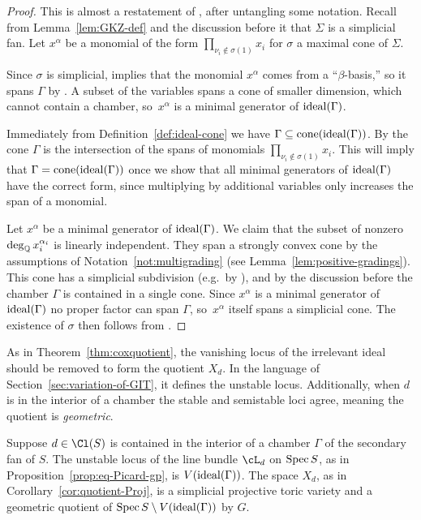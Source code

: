 \documentclass{article}
\begin{document}
\begin{proof}
  This is almost a restatement of \cite[Proposition 15.2.1]{CLS2011}, after untangling some notation.  Recall from Lemma~\ref{lem:GKZ-def} and the discussion before it that $\Sigma$ is a simplicial fan.  Let $x^\alpha$ be a monomial of the form $\prod_{\nu_i\notin\sigma(1)}x_i$ for $\sigma$ a maximal cone of $\Sigma$.

  Since $\sigma$ is simplicial, \cite[Proposition 14.3.1]{CLS2011} implies that the monomial $x^\alpha$ comes from a ``$\beta$-basis,'' so it spans $\Gamma$ by \cite[Proposition 15.2.1(b)]{CLS2011}.  A subset of the variables spans a cone of smaller dimension, which cannot contain a chamber, so~$x^\alpha$ is a minimal generator of $\operatorname{ideal}(\Gamma)$.

  Immediately from Definition~\ref{def:ideal-cone} we have $\Gamma\subseteq\operatorname{cone}(\operatorname{ideal}(\Gamma))$.  By \cite[Proposition 15.2.1(c)]{CLS2011} the cone $\Gamma$ is the intersection of the spans of monomials $\prod_{\nu_i\notin\sigma(1)}x_i$.  This will imply that $\Gamma=\operatorname{cone}(\operatorname{ideal}(\Gamma))$ once we show that all minimal generators of $\operatorname{ideal}(\Gamma)$ have the correct form, since multiplying by additional variables only increases the span of a monomial.

  Let $x^\alpha$ be a minimal generator of $\operatorname{ideal}(\Gamma)$.  We claim that the subset of nonzero $\deg_\mathbb Q x_i^{\alpha_i}$ is linearly independent.  They span a strongly convex cone by the assumptions of Notation~\ref{not:multigrading} (see Lemma~\ref{lem:positive-gradings}).  This cone has a simplicial subdivision (e.g.~by \cite[Corollary~3.8]{OP91}), and by the discussion before \cite[Proposition 15.2.10]{CLS2011} the chamber $\Gamma$ is contained in a single cone.  Since $x^\alpha$ is a minimal generator of $\operatorname{ideal}(\Gamma)$ no proper factor can span $\Gamma$, so~$x^\alpha$ itself spans a simplicial cone.  The existence of $\sigma$ then follows from \cite[Proposition 15.2.1(b)]{CLS2011}.  %
\end{proof}

As in Theorem~\ref{thm:coxquotient}, the vanishing locus of the irrelevant ideal should be removed to form the quotient $X_d$.  In the language of Section~\ref{sec:variation-of-GIT}, it defines the unstable locus.  Additionally, when $d$ is in the interior of a chamber the stable and semistable loci agree, meaning the quotient is \emph{geometric}.

\begin{thm}\label{thm:unstable}
  Suppose $d\in\Cl(S)$ is contained in the interior of a chamber $\Gamma$ of the secondary fan of $S$.  The unstable locus of the line bundle $\cL_d$ on $\operatorname{Spec} S$, as in Proposition~\ref{prop:eq-Picard-gp}, is $V(\operatorname{ideal}(\Gamma))$.  The space $X_d$, as in Corollary~\ref{cor:quotient-Proj}, is a simplicial projective toric variety and a geometric quotient of $\operatorname{Spec} S\setminus V(\operatorname{ideal}(\Gamma))$ by $G$.
\end{thm}
\end{document}
